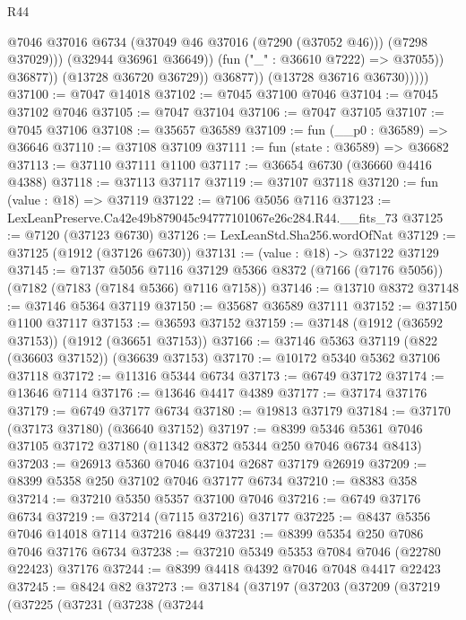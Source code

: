 \begin{lexlean}{R44}
\begin{coremodule}
{                              @7046
                              @37016
                              @6734
                              (@37049 @46 @37016 (@7290 (@37052 @46)))
                              (@7298 @37029)))
                          (@32944 @36961 @36649))
                        (fun ("_" : @36610 @7222) => @37055))
                      @36877))
                  (@13728 @36720 @36729))
                @36877))
            (@13728 @36716 @36730)))))
@37100 := @7047 @14018
@37102 := @7045 @37100 @7046
@37104 := @7045 @37102 @7046
@37105 := @7047 @37104
@37106 := @7047 @37105
@37107 := @7045 @37106
@37108 := @35657 @36589
@37109 := fun (__p0 : @36589) => @36646
@37110 := @37108 @37109
@37111 := fun (state : @36589) => @36682
@37113 := @37110 @37111 @1100
@37117 := @36654 @6730 (@36660 @4416 @4388)
@37118 := @37113 @37117
@37119 := @37107 @37118
@37120 := fun (value : @18) => @37119
@37122 := @7106 @5056 @7116
@37123 := LexLeanPreserve.Ca42e49b879045c94777101067e26c284.R44.__fits_73
@37125 := @7120 (@37123 @6730)
@37126 := LexLeanStd.Sha256.wordOfNat
@37129 := @37125 (@1912 (@37126 @6730))
@37131 := (value : @18) -> @37122 @37129
@37145 := @7137
    @5056
    @7116
    @37129
    @5366
    @8372
    (@7166 (@7176 @5056))
    (@7182 (@7183 (@7184 @5366) @7116 @7158))
@37146 := @13710 @8372
@37148 := @37146 @5364 @37119
@37150 := @35687 @36589 @37111
@37152 := @37150 @1100 @37117
@37153 := @36593 @37152
@37159 := @37148 (@1912 (@36592 @37153)) (@1912 (@36651 @37153))
@37166 := @37146 @5363 @37119 (@822 (@36603 @37152)) (@36639 @37153)
@37170 := @10172 @5340 @5362 @37106 @37118
@37172 := @11316 @5344 @6734
@37173 := @6749 @37172
@37174 := @13646 @7114
@37176 := @13646 @4417 @4389
@37177 := @37174 @37176
@37179 := @6749 @37177 @6734
@37180 := @19813 @37179
@37184 := @37170 (@37173 @37180) (@36640 @37152)
@37197 := @8399 @5346 @5361 @7046 @37105 @37172 @37180 (@11342 @8372 @5344 @250 @7046 @6734 @8413)
@37203 := @26913 @5360 @7046 @37104 @2687 @37179 @26919
@37209 := @8399 @5358 @250 @37102 @7046 @37177 @6734
@37210 := @8383 @358
@37214 := @37210 @5350 @5357 @37100 @7046
@37216 := @6749 @37176 @6734
@37219 := @37214 (@7115 @37216) @37177
@37225 := @8437 @5356 @7046 @14018 @7114 @37216 @8449
@37231 := @8399 @5354 @250 @7086 @7046 @37176 @6734
@37238 := @37210 @5349 @5353 @7084 @7046 (@22780 @22423) @37176
@37244 := @8399 @4418 @4392 @7046 @7048 @4417 @22423
@37245 := @8424 @82
@37273 := @37184
    (@37197
      (@37203
        (@37209
          (@37219
            (@37225
              (@37231
                (@37238
                  (@37244
}
\end{coremodule}
\end{lexlean}
